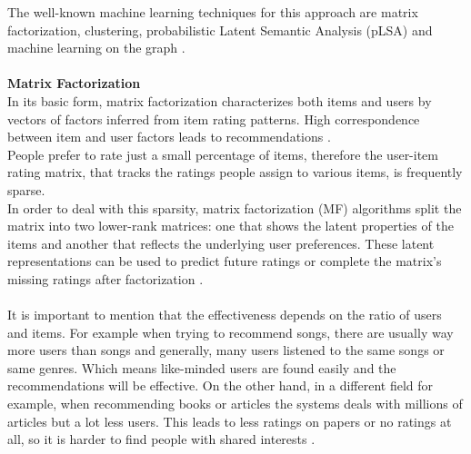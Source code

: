 \documentclass[\myFontSize,oneside,english,hidelinks,a4paper]{article}
\begin{document}
The well-known machine learning techniques for this approach are matrix factorization, clustering, probabilistic Latent Semantic Analysis (pLSA) and machine learning on the graph \cite{NILASHI2018507}. \\\\
%
%
%
\textbf{Matrix Factorization}\\
In its basic form, matrix factorization characterizes both items and users by vectors of factors inferred from item rating patterns. High correspondence between item and user factors leads to recommendations \cite{5197422}. \\
People prefer to rate just a small percentage of items, therefore the user-item rating matrix, that tracks the ratings people assign to various items, is frequently sparse.\\
In order to deal with this sparsity, matrix factorization (MF) algorithms split the matrix into two lower-rank matrices: one that shows the latent properties of the items and another that reflects the underlying user preferences. These latent representations can be used to predict future ratings or complete the matrix's missing ratings after factorization \cite{Tokala2023}.\\\\
%
%
%
It is important to mention that the effectiveness depends on the ratio of users and items. For example when trying to recommend songs, there are usually way more users than songs and generally, many users listened to the same songs or same genres. Which means like-minded users are found easily and the recommendations will be effective. On the other hand, in a different field for example, when recommending books or articles the systems deals with millions of articles but a lot less users. This leads to less ratings on papers or no ratings at all, so it is harder to find people with shared interests \cite{Beel2016305}.\\
\end{document}
